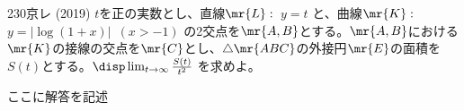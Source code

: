 \begin{thm}{230}{}{京レ (2019)}
 $t$を正の実数とし、直線$\mr{L}:$~$y=t$ と、曲線$\mr{K}:$~$y=\left|\log (1+x)\right|$~$(x>-1)$ の2交点を$\mr{A, B}$とする。$\mr{A, B}$における$\mr{K}$の接線の交点を$\mr{C}$とし、$\triangle\mr{ABC}$の外接円$\mr{E}$の面積を$S(t)$とする。$\disp \lim_{t\to\infty} \frac{S(t)}{t^2}$ を求めよ。
\end{thm}

ここに解答を記述